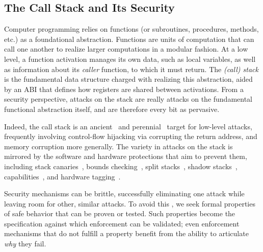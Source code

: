 \documentclass[10pt,conference]{ieeetran}%
\theoremstyle{definition}
\begin{document}
\subsection{The Call Stack and Its Security}

Computer programming relies on functions (or subroutines, procedures, methods, etc.)
as a foundational abstraction. Functions are units of computation that
can call one another to realize larger computations in a modular fashion.
%
At a low level, a function activation manages its own data, such as local variables, as
well as information about its \emph{caller} function, to which it must return.
The \emph{(call) stack} is the fundamental data structure charged with realizing
this abstraction, aided by an ABI that defines how registers are shared between activations.
From a security perspective, attacks on the stack are really attacks
on the fundamental functional abstraction itself, and are therefore every bit as
pervasive.

Indeed, the call stack is an ancient~\cite{phrack96:smashingthestack} and
perennial~\cite{mitre-cwe,DBLP:conf/raid/VeendCB12,
  DBLP:conf/sp/SzekeresPWS13,
  DBLP:conf/sp/HuSACSL16,msrc-bluehat,chromium-security}
target for low-level attacks, frequently involving control-flow hijacking via corrupting
the return address, and memory corruption more generally.
%
%
The variety in attacks on the stack is mirrored by the
software and hardware protections that aim to prevent them,
%
including stack canaries~\cite{Cowan+98},
bounds checking~\cite{NagarakatteZMZ09,NagarakatteZMZ10,DeviettiBMZ08},
split stacks~\cite{Kuznetsov+14},
shadow stacks~\cite{Dang+15,Shanbhogue+19},
capabilities~\cite{Woodruff+14,Chisnall+15,SkorstengaardLocal,SkorstengaardSTKJFP,Georges22:TempsDesCerises},
and hardware tagging~\cite{DBLP:conf/sp/RoesslerD18,Gollapudi+23}.

Security mechanisms can be brittle, successfully eliminating one attack while leaving room for
other, similar attacks. To avoid this , we seek formal properties of safe behavior that can be proven
or tested. Such properties become the specification against which enforcement can be validated;
even enforcement mechanisms that do not fulfill a property benefit from the ability to articulate
\emph{why} they fail.
\end{document}
